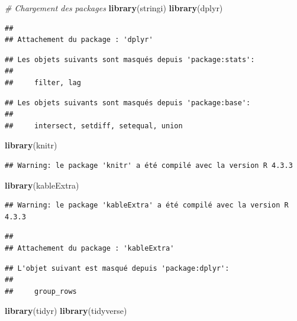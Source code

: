\documentclass[
]{article}
\author{}
\date{\vspace{-2.5em}}
\newenvironment{Shaded}{\begin{snugshade}}{\end{snugshade}}
\newcommand{\CommentTok}[1]{\textcolor[rgb]{0.56,0.35,0.01}{\textit{#1}}}
\newcommand{\FunctionTok}[1]{\textcolor[rgb]{0.13,0.29,0.53}{\textbf{#1}}}
\newcommand{\NormalTok}[1]{#1}
\begin{document}
\begin{Shaded}
\begin{Highlighting}[]
\CommentTok{\# Chargement des packages}
\FunctionTok{library}\NormalTok{(stringi)}
\FunctionTok{library}\NormalTok{(dplyr)}
\end{Highlighting}
\end{Shaded}

\begin{verbatim}
## 
## Attachement du package : 'dplyr'
\end{verbatim}

\begin{verbatim}
## Les objets suivants sont masqués depuis 'package:stats':
## 
##     filter, lag
\end{verbatim}

\begin{verbatim}
## Les objets suivants sont masqués depuis 'package:base':
## 
##     intersect, setdiff, setequal, union
\end{verbatim}

\begin{Shaded}
\begin{Highlighting}[]
\FunctionTok{library}\NormalTok{(knitr)}
\end{Highlighting}
\end{Shaded}

\begin{verbatim}
## Warning: le package 'knitr' a été compilé avec la version R 4.3.3
\end{verbatim}

\begin{Shaded}
\begin{Highlighting}[]
\FunctionTok{library}\NormalTok{(kableExtra)}
\end{Highlighting}
\end{Shaded}

\begin{verbatim}
## Warning: le package 'kableExtra' a été compilé avec la version R 4.3.3
\end{verbatim}

\begin{verbatim}
## 
## Attachement du package : 'kableExtra'
\end{verbatim}

\begin{verbatim}
## L'objet suivant est masqué depuis 'package:dplyr':
## 
##     group_rows
\end{verbatim}

\begin{Shaded}
\begin{Highlighting}[]
\FunctionTok{library}\NormalTok{(tidyr)}
\FunctionTok{library}\NormalTok{(tidyverse)}
\end{Highlighting}
\end{Shaded}
\end{document}
